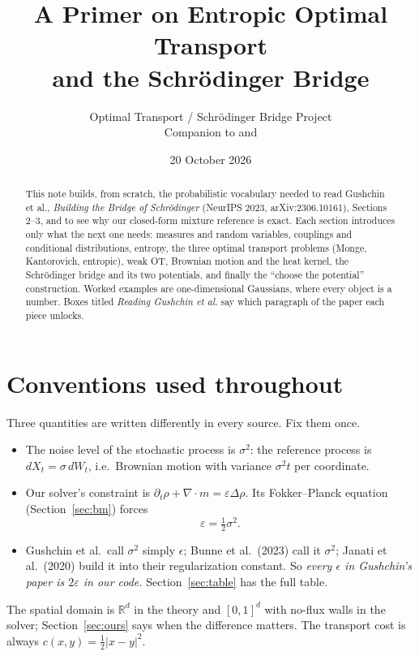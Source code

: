 \documentclass[11pt]{article}
\title{A Primer on Entropic Optimal Transport\\ and the Schr\"odinger Bridge}
\author{Optimal Transport / Schr\"odinger Bridge Project\\
Companion to \code{python/shared/mixture\_sb.py} and \code{paper\_route\_sb.py}}
\date{20 October 2026}
\newcommand{\eps}{\varepsilon}
\newcommand{\R}{\mathbb{R}}
\newcommand{\dv}{\nabla\cdot}
\theoremstyle{definition}
\theoremstyle{plain}
\begin{document}
\maketitle

\begin{abstract}
\noindent This note builds, from scratch, the probabilistic vocabulary needed to read
Gushchin et al., \emph{Building the Bridge of Schr\"odinger} (NeurIPS 2023,
arXiv:2306.10161), Sections 2--3, and to see why our closed-form mixture reference is exact.
Each section introduces only what the next one needs: measures and random variables,
couplings and conditional distributions, entropy, the three optimal transport problems
(Monge, Kantorovich, entropic), weak OT, Brownian motion and the heat kernel, the
Schr\"odinger bridge and its two potentials, and finally the ``choose the potential''
construction. Worked examples are one-dimensional Gaussians, where every object is a
number. Boxes titled \emph{Reading Gushchin et al.} say which paragraph of the paper each
piece unlocks.
\end{abstract}

\tableofcontents

\section{Conventions used throughout}
\label{sec:conv}

Three quantities are written differently in every source. Fix them once.
\begin{itemize}
  \item The noise level of the stochastic process is $\sigma^2$: the reference process is
        $dX_t=\sigma\,dW_t$, i.e.\ Brownian motion with variance $\sigma^2 t$ per coordinate.
  \item Our solver's constraint is $\partial_t\rho+\dv m=\eps\Delta\rho$. Its Fokker--Planck
        equation (Section~\ref{sec:bm}) forces
        \[
          \eps=\tfrac12\sigma^2 .
        \]
  \item Gushchin et al.\ call $\sigma^2$ simply $\epsilon$; Bunne et al.\ (2023) call it $\sigma^2$;
        Janati et al.\ (2020) build it into their regularization constant. So \emph{every $\epsilon$
        in Gushchin's paper is $2\eps$ in our code.} Section~\ref{sec:table} has the full table.
\end{itemize}
The spatial domain is $\R^d$ in the theory and $[0,1]^d$ with no-flux walls in the solver;
Section~\ref{sec:ours} says when the difference matters. The transport cost is always
$c(x,y)=\tfrac12|x-y|^2$.
\end{document}
